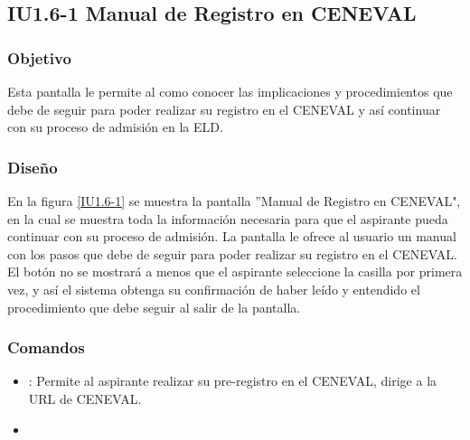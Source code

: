 \subsection{IU1.6-1 Manual de Registro en CENEVAL}

\subsubsection{Objetivo}

Esta pantalla le permite al  como conocer las implicaciones y procedimientos que debe de seguir para poder realizar su registro en el CENEVAL y así continuar con su proceso de admisión en la ELD.


\subsubsection{Diseño}
En la figura \ref{IU1.6-1} se muestra la pantalla ''Manual de Registro en CENEVAL", en la cual se muestra toda la información necesaria para que el aspirante pueda continuar con su proceso de admisión. La pantalla le ofrece al usuario un manual con los pasos que debe de seguir para poder realizar su registro en el CENEVAL.
El botón  no se mostrará a menos que el aspirante seleccione la casilla  por primera vez, y así el sistema obtenga su confirmación de haber leído y entendido el procedimiento que debe seguir al salir de la pantalla. 



\subsubsection{Comandos}
\begin{itemize}
	\item {}: Permite al aspirante realizar su pre-registro en el CENEVAL, dirige a la URL de CENEVAL.
	\item 
\end{itemize}

